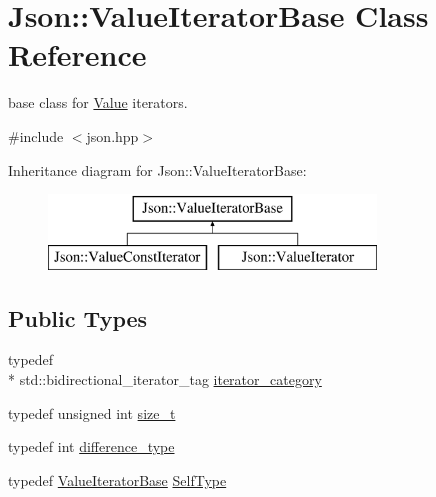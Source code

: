 \hypertarget{class_json_1_1_value_iterator_base}{\section{Json\-:\-:Value\-Iterator\-Base Class Reference}
\label{class_json_1_1_value_iterator_base}
}


base class for \hyperlink{class_json_1_1_value}{Value} iterators.  




{\ttfamily \#include $<$json.\-hpp$>$}

Inheritance diagram for Json\-:\-:Value\-Iterator\-Base\-:\begin{figure}[H]
\begin{center}
\leavevmode
\includegraphics[height=2.000000cm]{class_json_1_1_value_iterator_base}
\end{center}
\end{figure}
\subsection*{Public Types}
\begin{DoxyCompactItemize}
\item 
typedef \\*
std\-::bidirectional\-\_\-iterator\-\_\-tag \hyperlink{class_json_1_1_value_iterator_base_a02fd11a4fbdc0007da1e8bcf5e6b83c3}{iterator\-\_\-category}
\item 
typedef unsigned int \hyperlink{class_json_1_1_value_iterator_base_a9d3a3c7ce5cdefe23cb486239cf07bb5}{size\-\_\-t}
\item 
typedef int \hyperlink{class_json_1_1_value_iterator_base_a4e44bf8cbd17ec8d6e2c185904a15ebd}{difference\-\_\-type}
\item 
typedef \hyperlink{class_json_1_1_value_iterator_base}{Value\-Iterator\-Base} \hyperlink{class_json_1_1_value_iterator_base_a9d2a940d03ea06d20d972f41a89149ee}{Self\-Type}
\end{DoxyCompactItemize}
